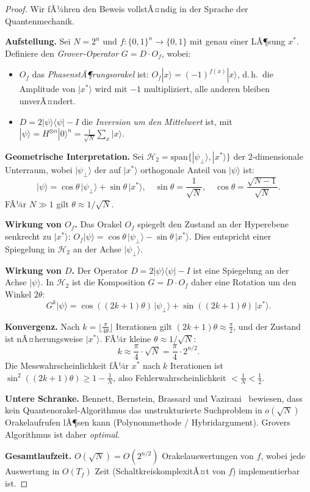 ﻿\documentclass[a4paper,12pt]{article}
\theoremstyle{definition}
\begin{document}
\begin{proof}
Wir fÃ¼hren den Beweis vollstÃ¤ndig in der Sprache der Quantenmechanik.

\textbf{Aufstellung.}
Sei $N = 2^n$ und $f: \{0,1\}^n \to \{0,1\}$ mit genau einer LÃ¶sung $x^*$.
Definiere den \emph{Grover-Operator} $G = D \cdot O_f$, wobei:
\begin{itemize}
\item $O_f$ das \emph{PhasenstÃ¶rungsorakel} ist:
  $O_f |x\rangle = (-1)^{f(x)} |x\rangle$, d.\,h.\ die Amplitude von $|x^*\rangle$
  wird mit $-1$ multipliziert, alle anderen bleiben unverÃ¤ndert.
\item $D = 2|\psi\rangle\langle\psi| - I$ die \emph{Inversion um den Mittelwert} ist,
  mit $|\psi\rangle = H^{\otimes n}|0\rangle^n = \frac{1}{\sqrt{N}}\sum_{x}|x\rangle$.
\end{itemize}

\textbf{Geometrische Interpretation.}
Sei $\mathcal{H}_2 = \mathrm{span}\{|\psi_\perp\rangle, |x^*\rangle\}$ der
2-dimensionale Unterraum, wobei $|\psi_\perp\rangle$ der auf $|x^*\rangle$
orthogonale Anteil von $|\psi\rangle$ ist:
\[
  |\psi\rangle = \cos\theta\,|\psi_\perp\rangle + \sin\theta\,|x^*\rangle,
  \quad \sin\theta = \frac{1}{\sqrt{N}}, \quad \cos\theta = \frac{\sqrt{N-1}}{\sqrt{N}}.
\]
FÃ¼r $N \gg 1$ gilt $\theta \approx 1/\sqrt{N}$.

\textbf{Wirkung von $O_f$.}
Das Orakel $O_f$ spiegelt den Zustand an der Hyperebene senkrecht zu $|x^*\rangle$:
$O_f |\psi\rangle = \cos\theta\,|\psi_\perp\rangle - \sin\theta\,|x^*\rangle$.
Dies entspricht einer Spiegelung in $\mathcal{H}_2$ an der Achse $|\psi_\perp\rangle$.

\textbf{Wirkung von $D$.}
Der Operator $D = 2|\psi\rangle\langle\psi| - I$ ist eine Spiegelung an der
Achse $|\psi\rangle$. In $\mathcal{H}_2$ ist die Komposition $G = D \cdot O_f$
daher eine Rotation um den Winkel $2\theta$:
\[
  G^k |\psi\rangle = \cos((2k+1)\theta)\,|\psi_\perp\rangle
                   + \sin((2k+1)\theta)\,|x^*\rangle.
\]

\textbf{Konvergenz.}
Nach $k = \lfloor \frac{\pi}{4\theta} \rfloor$ Iterationen gilt
$(2k+1)\theta \approx \frac{\pi}{2}$, und der Zustand ist nÃ¤herungsweise $|x^*\rangle$.
FÃ¼r kleine $\theta \approx 1/\sqrt{N}$:
\[
  k \approx \frac{\pi}{4} \cdot \sqrt{N} = \frac{\pi}{4} \cdot 2^{n/2}.
\]
Die Messwahrscheinlichkeit fÃ¼r $x^*$ nach $k$ Iterationen ist
$\sin^2((2k+1)\theta) \geq 1 - \frac{1}{N}$, also Fehlerwahrscheinlichkeit
$< \frac{1}{N} < \frac{1}{2}$.

\textbf{Untere Schranke.}
Bennett, Bernstein, Brassard und Vazirani~\cite{Gro96} bewiesen, dass kein
Quantenorakel-Algorithmus das unstrukturierte Suchproblem in $o(\sqrt{N})$
Orakelaufrufen lÃ¶sen kann (Polynommethode / Hybridargument). Grovers Algorithmus
ist daher \emph{optimal}.

\textbf{Gesamtlaufzeit.}
$O(\sqrt{N}) = O(2^{n/2})$ Orakelauswertungen von $f$, wobei jede Auswertung
in $O(T_f)$ Zeit (SchaltkreiskomplexitÃ¤t von $f$) implementierbar ist.
\end{proof}
\end{document}
